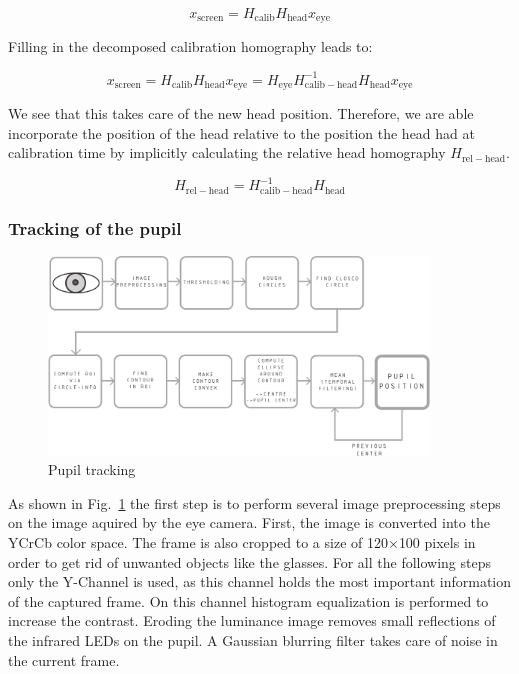 \begin{equation}
  x_\mathrm{screen} = H_\mathrm{calib}H_\mathrm{head}x_\mathrm{eye} 
\end{equation}

Filling in the decomposed calibration homography leads to:

\begin{equation}
  x_\mathrm{screen} = H_\mathrm{calib}H_\mathrm{head}x_\mathrm{eye} = H_\mathrm{eye} H_\mathrm{calib-head} ^{-1} H_\mathrm{head} x_\mathrm{eye}
\end{equation}

We see that this takes care of the new head position. Therefore, we are able incorporate the position of the head relative to the position the head had at calibration time by implicitly calculating the relative head homography $H_\mathrm{rel-head}$.

\begin{equation}
  H_\mathrm{rel-head} = H_\mathrm{calib-head}^{-1} H_\mathrm{head}
\end{equation}

\subsubsection{Tracking of the pupil}
\begin{figure}[H]
  \centering
  \includegraphics[width=0.9\textwidth]{../finalpres/02c.pdf}
  \caption{Pupil tracking}\label{fig:pupil}
\end{figure}
As shown in Fig.~\ref{fig:pupil} the first step is to perform several image preprocessing steps on the image aquired by the eye camera. First, the image is converted into the YCrCb color space. The frame is also cropped to a size of 120$\times$100 pixels in order to get rid of unwanted objects like the glasses.
For all the following steps only the Y-Channel is used, as this channel holds the most important information of the captured frame. 
On this channel histogram equalization is performed to increase the contrast. 
Eroding the luminance image removes small reflections of the infrared LEDs on the pupil. 
A Gaussian blurring filter takes care of noise in the current frame. 

